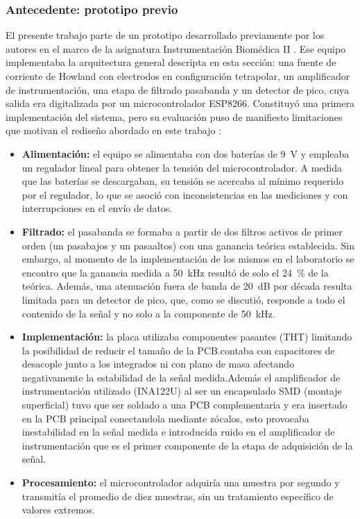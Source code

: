 \documentclass[12pt,a4paper]{article}
\begin{document}
\subsubsection{Antecedente: prototipo previo}

El presente trabajo parte de un prototipo desarrollado previamente por los autores en el marco de la
asignatura Instrumentación Biomédica II \cite{informe_grupo2_2025}. Ese equipo implementaba la
arquitectura general descripta en esta sección: una fuente de corriente de Howland con electrodos en
configuración tetrapolar, un amplificador de instrumentación, una etapa de filtrado pasabanda y un
detector de pico, cuya salida era digitalizada por un microcontrolador ESP8266. Constituyó una primera
implementación del sistema, pero su evaluación puso de manifiesto limitaciones que motivan el rediseño
abordado en este trabajo \cite{informe_grupo2_2025}:

\begin{itemize}
    \item \textbf{Alimentación:} el equipo se alimentaba con dos baterías de 9~V y empleaba un regulador
    lineal para obtener la tensión del microcontrolador. A medida que las baterías se descargaban, su
    tensión se acercaba al mínimo requerido por el regulador, lo que se asoció con inconsistencias en
    las mediciones y con interrupciones en el envío de datos.
    \item \textbf{Filtrado:} el pasabanda se formaba a partir de dos filtros activos de primer orden 
    (un pasabajos y un pasaaltos) con una ganancia teórica establecida. Sin embargo, al momento de
    la implementación de los mismos en el laboratorio se encontro que  
    la ganancia medida a 50~kHz resultó de solo el 24~\% de la teórica. Además,
    una atenuación fuera de banda de 20~dB por década resulta limitada para un detector de pico, que,
    como se discutió, responde a todo el contenido de la señal y no solo a la componente de 50~kHz.
    \item \textbf{Implementación:} la placa utilizaba componentes pasantes (THT) limitando
    la posibilidad de reducir el tamaño de la PCB.\@Tampoco contaba con capacitores
    de desacople junto a los integrados ni con plano de masa afectando negativamente la estabilidad
    de la señal medida.\@ Además el amplificador de instrumentación utilizado (INA122U) al ser un encapsulado
    SMD (montaje superficial) tuvo que ser soldado a una PCB complementaria y era insertado en la PCB principal
    conectandola mediante zócalos, esto provocaba inestabilidad en la señal medida e introducida ruido en el 
    amplificador de instrumentación que es el primer componente de la etapa de adquisición de la señal.
    \item \textbf{Procesamiento:} el microcontrolador adquiría una muestra por segundo y transmitía el
    promedio de diez muestras, sin un tratamiento específico de valores extremos.
\end{itemize}
\end{document}
